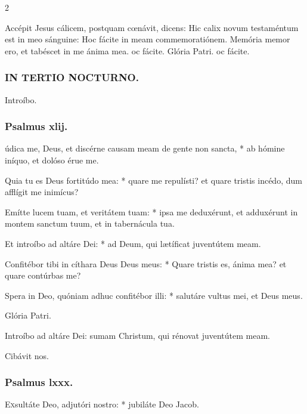 \documentclass[9pt,twoside]{extarticle}
\begin{document}
\begin{multicols}{2}
\begin{tightlist}{}
\item {} Accépit Jesus cálicem, postquam cœnávit, dicens: Hic calix novum testaméntum est in meo sánguine: \textred{*} Hoc fácite in meam commemoratiónem.  Memória memor ero, et tabéscet in me ánima mea. oc fácite. Glória Patri. oc fácite.
\end{tightlist}

\subsubsection*{\center \textsc{IN TERTIO NOCTURNO.}}
\begin{tightlist}{}
\item {} Introíbo.
\end{tightlist}
\subsubsection*{\center Psalmus xlij.}
údica me, Deus, et discérne causam meam de gente non sancta, * ab hómine iníquo, et dolóso érue me.

Quia tu es Deus fortitúdo mea: * quare me repulísti? et quare tristis incédo, dum afflígit me inimícus?

Emítte lucem tuam, et veritátem tuam: * ipsa me deduxérunt, et adduxérunt in montem sanctum tuum, et in tabernácula tua.

Et introíbo ad altáre Dei: * ad Deum, qui lætíficat juventútem meam.

Confitébor tibi in cíthara Deus Deus meus: * Quare tristis es, ánima mea? et quare contúrbas me?

Spera in Deo, quóniam adhuc confitébor illi: * salutáre vultus mei, et Deus meus.

Glória Patri.

\begin{tightlist}{}
\item {} Introíbo ad altáre Dei: sumam Christum, qui rénovat juventútem meam.
\item {} Cibávit nos.
\end{tightlist}

\subsubsection*{\center Psalmus lxxx.}
\lettrine{E}xsultáte Deo, adjutóri nostro: * jubiláte Deo Jacob.


\end{multicols}
\end{document}
